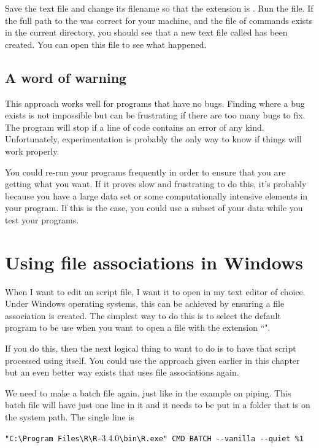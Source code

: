 Save the text file and change its filename so that the extension is . Run the file. If the full path to the  was correct for your machine, and the file of commands  exists in the current directory, you should see that a new text file called  has been created. You can open this file to see what happened. 
 
\subsection*{A word of warning} 
 
This approach works well for programs that have no bugs. Finding where a bug exists is not impossible but can be frustrating if there are too many bugs to fix. The program will stop if a line of code contains an error of any kind. Unfortunately, experimentation is probably the only way to know if things will work properly.  
 
You could re-run your programs frequently in order to ensure that you are getting what you want. If it proves slow and frustrating to do this, it's probably because you have a large data set or some computationally intensive elements in your program. If this is the case, you could use a subset of your data while you test your programs. 
 
 
 
\section{Using file associations in Windows} 
 
When I want to edit an \R{} script file, I want it to open in my text editor of choice. Under Windows operating systems, this can be achieved by ensuring a file association is created. The simplest way to do this is to select the default program to be use when you want to open a file with the extension ``". 
 
If you do this, then the next logical thing to want to do is to have that \R{} script processed using \R{} itself. You could use the approach given earlier in this chapter but an even better way exists that uses file associations again. 
 
We need to make a batch file again, just like in the example on piping. This batch file will have just one line in it and it needs to be put in a folder that is on the system path. The single line is 
\begin{center} 
\verb+"C:\Program Files\R\R-+3.4.0\verb+\bin\R.exe" CMD BATCH --vanilla --quiet %1+ 
\end{center} 
 
